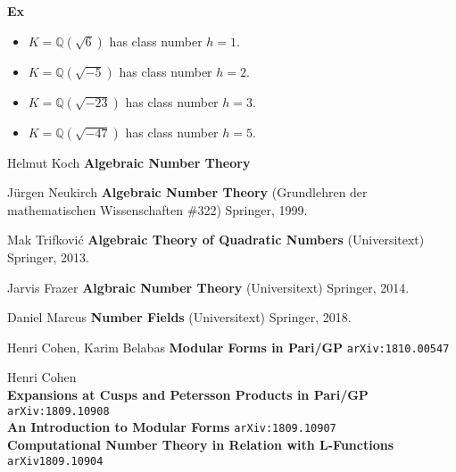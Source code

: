 \documentclass[12pt]{article}
\begin{document}
\textbf{Ex} 
\begin{itemize}
\item $K = \mathbb{Q}(\sqrt{6})$ \hspace{15pt}has class number $h=1$.
\item $K = \mathbb{Q}(\sqrt{-5})$ \hspace{5pt}has class number $h=2$.
\item $K = \mathbb{Q}(\sqrt{-23})$ has class number $h=3$.
\item $K = \mathbb{Q}(\sqrt{-47})$ has class number $h=5$.
\end{itemize}
\vfill

\begin{thebibliography}{}

\item Helmut Koch \textbf{Algebraic Number Theory} 

\item J\"{u}rgen Neukirch \textbf{Algebraic Number Theory} (Grundlehren der mathematischen Wissenschaften \#322) Springer, 1999.


\item Mak Trifkovi\'{c} \textbf{Algebraic Theory of Quadratic Numbers} (Universitext) Springer, 2013.

\item Jarvis Frazer \textbf{Algbraic Number Theory} (Universitext) Springer, 2014.

\item Daniel Marcus \textbf{Number Fields} (Universitext) Springer, 2018.

\end{thebibliography}

\begin{thebibliography}{}

\item Henri Cohen, Karim Belabas \textbf{Modular Forms in Pari/GP} \texttt{arXiv:1810.00547}
\item Henri Cohen \\ 
\textbf{Expansions at Cusps and Petersson Products in Pari/GP} \texttt{arXiv:1809.10908
 } \\
\textbf{An Introduction to Modular Forms} \texttt{arXiv:1809.10907} \\
\textbf{Computational Number Theory in Relation with L-Functions} \texttt{arXiv1809.10904}

\end{thebibliography}
\end{document}
